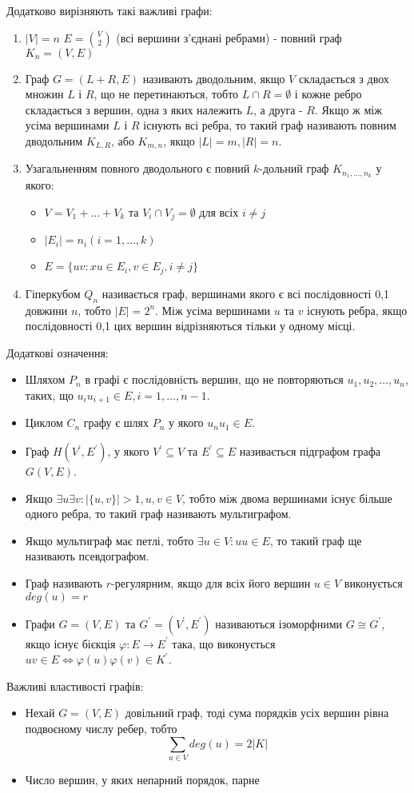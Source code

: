 Додатково вирізняють такі важливі графи:
\begin{enumerate}
        \item $\vert V \vert = n$ $E = {V \choose 2}$ (всі вершини з'єднані ребрами) - повний граф $K_n = (V,E)$
        \item Граф $G = (L+R,E)$ називають дводольним, якщо $V$ складається з двох множин $L$ і $R$, що не перетинаються, тобто $L \cap R = \emptyset$ і кожне ребро складається з вершин, одна з яких належить $L$, а друга - $R$. Якщо ж між усіма вершинами $L$ і $R$ існують всі ребра, то такий граф називають повним дводольним $K_{L,R}$, або $K_{m,n}$, якщо $\vert L \vert = m, \vert R \vert = n$.
        \item Узагальненням повного дводольного є повний $k$-дольний граф $K_{n_1,\dots,n_k}$ у якого:
        \begin{itemize}     
        \item $V=V_1+\dots+V_k$ та $V_i \cap V_j = \emptyset$ для всіх $i \ne j$
        \item $\vert E_i \vert = n_i (i=1,\dots,k)$
        \item $E = \lbrace uv : xu \in E_i, v \in E_j, i \ne j \rbrace$
        \end{itemize}
        \item Гіперкубом $Q_n$ називається граф, вершинами якого є всі послідовності 0,1 довжини $n$, тобто $\vert E \vert = 2^n$. Між усіма вершинами $u$ та $v$ існують ребра, якщо послідовності 0,1 цих вершин відрізняються тільки у одному місці.
\end{enumerate}

Додаткові означення:
\begin{itemize}
        \item Шляхом $P_n$ в графі є послідовність вершин, що не повторяються $u_1,u_2,\dots,u_n$, таких, що $u_iu_{i+1} \in E, i = \overline {1,\dots,n-1}$.
        \item Циклом $C_n$ графу є шлях $P_n$ у якого $u_nu_1 \in E$.
        \item Граф $H(V^\prime,E^\prime)$, у якого $V^\prime \subseteq V$ та $E^\prime \subseteq E$ називається підграфом графа $G(V,E)$.
        \item Якщо $\exists u \exists v : \vert \lbrace u,v \rbrace \vert > 1, u,v \in V$, тобто між двома вершинами існує більше одного ребра, то такий граф називають мультиграфом.
        \item Якщо мультиграф має петлі, тобто $\exists u \in V : uu \in E$, то такий граф ще називають псевдографом.
        \item Граф називають $r$-регулярним, якщо для всіх його вершин $u \in V$ виконується $deg(u)=r$
        \item Графи $G = (V,E)$ та $G^\prime = (V^\prime,E^\prime)$ називаються ізоморфними $G \cong G^\prime$, якщо існує бієкція $\varphi : E \to E^\prime$ така, що виконується $uv \in E \Leftrightarrow \varphi (u)\varphi (v) \in K^\prime$.
\end {itemize}

Важливі властивості графів:
\begin{itemize}
        \item Нехай $G=(V,E)$ довільний граф, тоді сума порядків усіх вершин рівна подвоєному числу ребер, тобто $$\sum_{u \in V} deg(u)=2\vert K \vert$$
        \item Число вершин, у яких непарний порядок, парне
\end{itemize}
